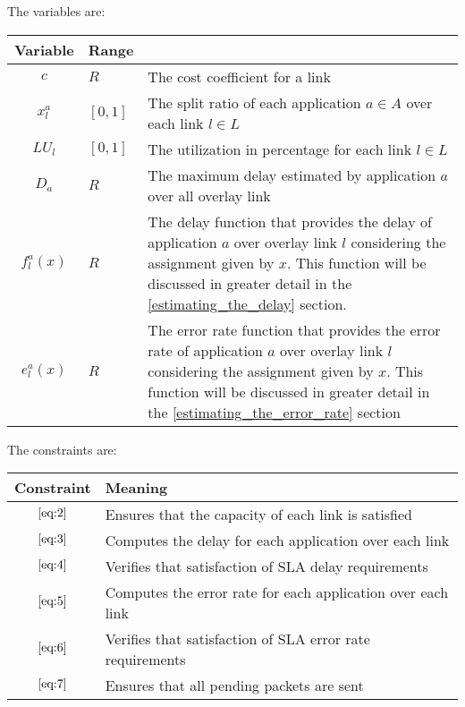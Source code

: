	The variables are:
	\begin{center}
		\begin{table}[htb]
			\centering
			\makegapedcells
			\begin{tabular}{|c|l|p{9cm}|}
				\hline
				Variable  & Range & \text{Notes}   \\ \hline
				$c$       & $R$ & The cost coefficient for a link   \\ \hline
				$x^a_l$       & $[0,1]$ & The split ratio of each application $a \in A$ over each link $l \in L$ \\ \hline
				$LU_l$       & $[0,1]$ & The utilization in percentage for each link $l \in L$ \\ \hline
				$D_a$       & $R$ & The maximum delay estimated by application $a$ over all overlay link \\ \hline
				$f^a_l(x)$       & $R$ & The delay function that provides the delay of application $a$ over overlay link $l$ considering the assignment given by $x$. This function will be discussed in greater detail in the \ref{estimating_the_delay} section.  \\ \hline
				$e^a_l(x)$       & $R$ & The error rate function that provides the error rate of application $a$ over overlay link $l$ considering the assignment given by $x$. This function will be discussed in greater detail in the \ref{estimating_the_error_rate} section \\ \hline
			\end{tabular}
		\end{table}
	\end{center}
\pagebreak
The constraints are:

	\begin{center}
	\begin{table}[htb]
		\centering
		\makegapedcells
		\begin{tabular}{|c|p{9cm}|}
			\hline
			Constraint  & Meaning \\ \hline
			$\eqref{eq:2}$ & Ensures that the capacity of each link is satisfied  \\ \hline
			$\eqref{eq:3}$ & Computes the delay for each application over each link \\ \hline
			$\eqref{eq:4}$ & Verifies that satisfaction of SLA delay requirements  \\ \hline
			$\eqref{eq:5}$ & Computes the error rate for each application over each link  \\ \hline
			$\eqref{eq:6}$ & Verifies that satisfaction of SLA error rate requirements  \\ \hline
			$\eqref{eq:7}$ & Ensures that all pending packets are sent  \\ \hline
		\end{tabular}
	\end{table}
\end{center}




